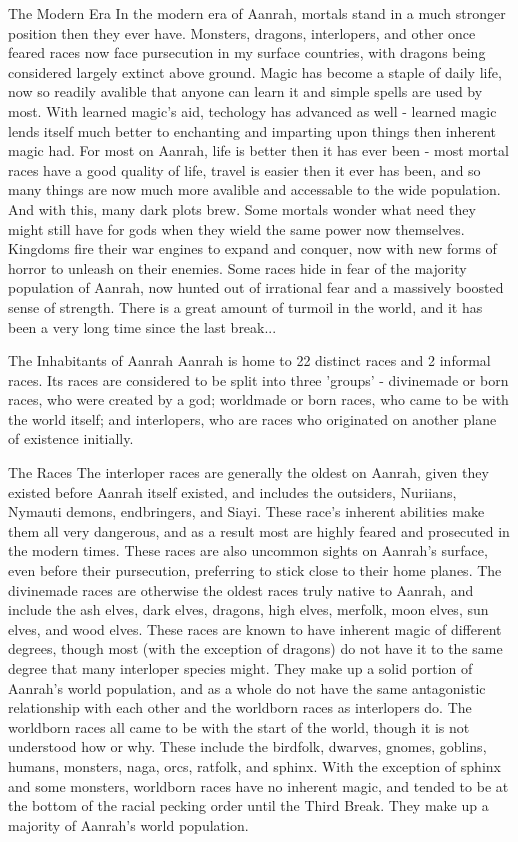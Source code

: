 The Modern Era
In the modern era of Aanrah, mortals stand in a much stronger position then they ever have. Monsters, dragons, interlopers, and other once feared races now face pursecution in my surface countries, with dragons being considered largely extinct above ground. Magic has become a staple of daily life, now so readily avalible that anyone can learn it and simple spells are used by most. With learned magic's aid, techology has advanced as well - learned magic lends itself much better to enchanting and imparting upon things then inherent magic had. For most on Aanrah, life is better then it has ever been - most mortal races have a good quality of life, travel is easier then it ever has been, and so many things are now much more avalible and accessable to the wide population.
And with this, many dark plots brew. Some mortals wonder what need they might still have for gods when they wield the same power now themselves. Kingdoms fire their war engines to expand and conquer, now with new forms of horror to unleash on their enemies. Some races hide in fear of the majority population of Aanrah, now hunted out of irrational fear and a massively boosted sense of strength. There is a great amount of turmoil in the world, and it has been a very long time since the last break...

The Inhabitants of Aanrah
Aanrah is home to 22 distinct races and 2 informal races. Its races are considered to be split into three 'groups' - divinemade or born races, who were created by a god; worldmade or born races, who came to be with the world itself; and interlopers, who are races who originated on another plane of existence initially.

The Races
The interloper races are generally the oldest on Aanrah, given they existed before Aanrah itself existed, and includes the outsiders, Nuriians, Nymauti demons, endbringers, and Siayi. These race's inherent abilities make them all very dangerous, and as a result most are highly feared and prosecuted in the modern times. These races are also uncommon sights on Aanrah's surface, even before their pursecution, preferring to stick close to their home planes.
The divinemade races are otherwise the oldest races truly native to Aanrah, and include the ash elves, dark elves, dragons, high elves, merfolk, moon elves, sun elves, and wood elves. These races are known to have inherent magic of different degrees, though most (with the exception of dragons) do not have it to the same degree that many interloper species might. They make up a solid portion of Aanrah's world population, and as a whole do not have the same antagonistic relationship with each other and the worldborn races as interlopers do.
The worldborn races all came to be with the start of the world, though it is not understood how or why. These include the birdfolk, dwarves, gnomes, goblins, humans, monsters, naga, orcs, ratfolk, and sphinx. With the exception of sphinx and some monsters, worldborn races have no inherent magic, and tended to be at the bottom of the racial pecking order until the Third Break. They make up a majority of Aanrah's world population.

